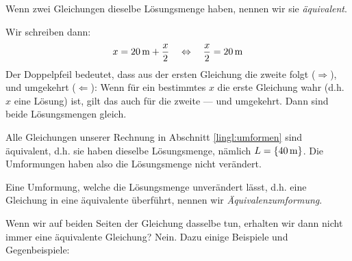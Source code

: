 \documentclass[%
11pt,%
twoside,%
titlepage,%
german,%
]{scrartcl}
\begin{document}
\begin{cdef}[Äquivalenz]{}
Wenn zwei Gleichungen dieselbe L\"osungsmenge haben, nennen wir sie \emph{\"aquivalent}.
\end{cdef}

Wir schreiben dann:
\begin{displaymath}
  x = \unit[20]{m} + \frac{x}{2} \quad\Leftrightarrow\quad \frac{x}{2} = \unit[20]{m}
\end{displaymath}
Der Doppelpfeil bedeutet, dass aus der ersten Gleichung die zweite folgt ($\Rightarrow$), und umgekehrt ($\Leftarrow$): Wenn f\"ur ein bestimmtes $x$ die erste Gleichung wahr (d.h. $x$ eine L\"osung) ist, gilt das auch f\"ur die zweite --- und umgekehrt. Dann sind beide L\"osungsmengen gleich.

Alle Gleichungen unserer Rechnung in Abschnitt \ref{lingl:umformen} sind \"aquivalent, d.h. sie haben dieselbe L\"osungsmenge, n\"amlich $L=\{\unit[40]{m}\}$. Die Umformungen haben also die L\"osungsmenge nicht ver\"andert.
\begin{cdef}[Äquivalenzumformung]{}
Eine Umformung, welche die L\"osungsmenge unver\"andert l\"asst, d.h. eine Gleichung in eine \"aquivalente \"uberf\"uhrt, nennen wir \emph{\"Aquivalenzumformung}.
\end{cdef}

Wenn wir auf beiden Seiten der Gleichung dasselbe tun, erhalten wir dann nicht immer eine \"aquivalente Gleichung? Nein. Dazu einige Beispiele und Gegenbeispiele:
\end{document}
